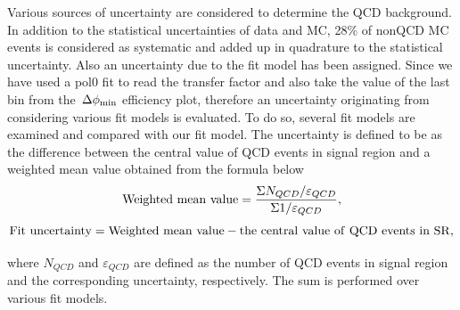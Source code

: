 Various sources of uncertainty are considered to determine the QCD background. 
In addition to the statistical uncertainties of data and MC, 28\% of 
nonQCD MC events is considered as systematic and added up in quadrature to the statistical uncertainty.
Also an uncertainty due to the fit model has been assigned. Since we have used a pol0 fit 
to read the transfer factor and also take the value of the last bin from the $\,{\Delta\phi_{\rm min}}$ efficiency plot,
therefore an uncertainty originating from considering various fit models is evaluated. To do so, several 
fit models are examined and compared with our fit model. The uncertainty is defined to be as the 
difference between the central value of QCD events in signal region and a weighted mean value obtained from the formula below 
\begin{equation}
{\rm Weighted~mean~value} =\frac{\Sigma N_{QCD}/\varepsilon_{QCD}}{\Sigma 1/\varepsilon_{QCD}},
\end{equation}
\begin{equation}
{\rm Fit~uncertainty} ={\rm Weighted~mean~value}-{\rm the~central~value~of~QCD~events~in~SR},
\end{equation}

where $N_{QCD}$ and $\varepsilon_{QCD}$ are defined as the number of QCD events in signal region and 
the corresponding uncertainty, respectively. The sum is performed over various fit models.\\ 

